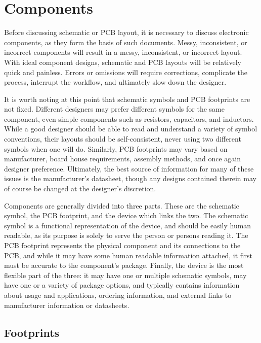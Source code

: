 \documentclass[12pt,article]{memoir}
\begin{document}
\newpage

\chapter{Components}
Before discussing schematic or PCB layout, it is necessary to discuss electronic components, as they form the basis of such documents. Messy, inconsistent, or incorrect components will result in a messy, inconsistent, or incorrect layout. With ideal component designs, schematic and PCB layouts will be relatively quick and painless. Errors or omissions will require corrections, complicate the process, interrupt the workflow, and ultimately slow down the designer.\par
It is worth noting at this point that schematic symbols and PCB footprints are not fixed. Different designers may prefer different symbols for the same component, even simple components such as resistors, capacitors, and inductors. While a good designer should be able to read and understand a variety of symbol conventions, their layouts should be self-consistent, never using two different symbols when one will do. Similarly, PCB footprints may vary based on manufacturer, board house requirements, assembly methods, and once again designer preference. Ultimately, the best source of information for many of these issues is the manufacturer's datasheet, though any designs contained therein may of course be changed at the designer's discretion.\par
Components are generally divided into three parts. These are the schematic symbol, the PCB footprint, and the device which links the two. The schematic symbol is a functional representation of the device, and should be easily human readable, as its purpose is solely to serve the person or persons reading it. The PCB footprint represents the physical component and its connections to the PCB, and while it may have some human readable information attached, it first must be accurate to the component's package. Finally, the device is the most flexible part of the three: it may have one or multiple schematic symbols, may have one or a variety of package options, and typically contains information about usage and applications, ordering information, and external links to manufacturer information or datasheets.\par

\section{Footprints}
\end{document}
